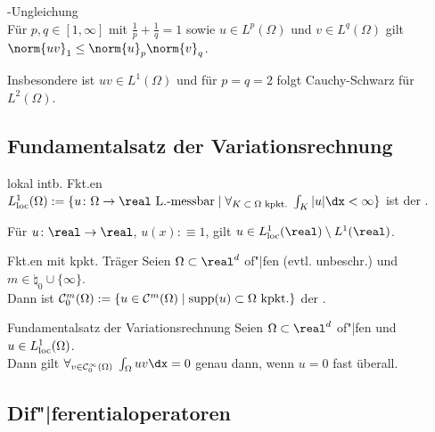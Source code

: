 \begin{Satz}{-Ungleichung}\\
    Für $p, q \in [1, \infty]$ mit $\frac{1}{p} + \frac{1}{q} = 1$ sowie
    $u \in L^p(\Omega)$ und $v \in L^q(\Omega)$ gilt $\norm{uv}_1 \le \norm{u}_p \norm{v}_q$.
\end{Satz}

\begin{Bem}
    Insbesondere ist $uv \in L^1(\Omega)$ und für $p = q = 2$ folgt Cauchy-Schwarz
    für $L^2(\Omega)$.
\end{Bem}

\subsection{%
    Fundamentalsatz der Variationsrechnung%
}

\begin{Def}{lokal intb. Fkt.en}
    $L^1_\loc(\Omega) := \{\text{$u\colon \Omega \to \real$ L.-messbar} \;|\;
    \forall_{\text{$K \subset \Omega$ kpkt.}}\; \int_K |u|\dx < \infty\}$
    ist der .
\end{Def}

\begin{Bsp}
    Für $u\colon \real \to \real$, $u(x) :\equiv 1$, gilt
    $u \in L^1_\loc(\real) \setminus L^1(\real)$.
\end{Bsp}

\linie

\begin{Def}{Fkt.en mit kpkt. Träger}
    Seien $\Omega \subset \real^d$ of"|fen (evtl. unbeschr.) und
    $m \in \natural_0 \cup \{\infty\}$.\\
    Dann ist
    $\mathcal{C}^m_0(\Omega) := \{u \in \mathcal{C}^m(\Omega) \;|\; \text{$\operatorname{supp}(u) \subset \Omega$ kpkt.}\}$
    der .
\end{Def}

\begin{Satz}{Fundamentalsatz der Variationsrechnung}
    Seien $\Omega \subset \real^d$ of"|fen und $u \in L^1_{\text{loc}}(\Omega)$.\\
    Dann gilt $\forall_{v \in \C^\infty_0(\Omega)}\; \int_\Omega uv \dx = 0$ genau dann, wenn
    $u = 0$ fast überall.
\end{Satz}

\pagebreak

\subsection{%
    Dif"|ferentialoperatoren%
}

